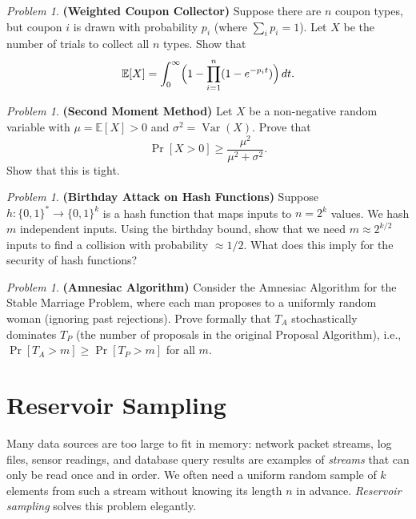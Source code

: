 \documentclass[twoside,12pt]{book}
\theoremstyle{plain}
\theoremstyle{definition}
\theoremstyle{remark}
\newtheorem{problem}[theorem]{Problem}
\begin{document}
\begin{problem}
{\bf (Weighted Coupon Collector)} Suppose there are $n$ coupon types, but coupon $i$ is drawn with probability $p_i$ (where $\sum_i p_i = 1$). Let $X$ be the number of trials to collect all $n$ types. Show that
\[
\mathbb{E}[X] = \int_0^{\infty} \Bigl(1 - \prod_{i=1}^{n}(1 - e^{-p_i t})\Bigr)\, dt.
\]
\end{problem}

\begin{problem}
{\bf (Second Moment Method)} Let $X$ be a non-negative random variable with $\mu = \mathbb{E}[X] > 0$ and $\sigma^2 = \operatorname{Var}(X)$. Prove that
\[
\Pr[X > 0] \geq \frac{\mu^2}{\mu^2 + \sigma^2}.
\]
Show that this is tight.
\end{problem}

\begin{problem}
{\bf (Birthday Attack on Hash Functions)} Suppose $h : \{0,1\}^* \to \{0,1\}^k$ is a hash function that maps inputs to $n = 2^k$ values. We hash $m$ independent inputs. Using the birthday bound, show that we need $m \approx 2^{k/2}$ inputs to find a collision with probability $\approx 1/2$. What does this imply for the security of hash functions?
\end{problem}

\begin{problem}
{\bf (Amnesiac Algorithm)} Consider the Amnesiac Algorithm for the Stable Marriage Problem, where each man proposes to a uniformly random woman (ignoring past rejections). Prove formally that $T_A$ stochastically dominates $T_P$ (the number of proposals in the original Proposal Algorithm), i.e., $\Pr[T_A > m] \geq \Pr[T_P > m]$ for all $m$.
\end{problem}

\section{Reservoir Sampling}
\label{sec:reservoir-sampling}

Many data sources are too large to fit in memory: network packet streams, log files, sensor readings, and database query results are examples of \emph{streams} that can only be read once and in order. We often need a uniform random sample of $k$ elements from such a stream without knowing its length $n$ in advance. \emph{Reservoir sampling} solves this problem elegantly.
\end{document}
